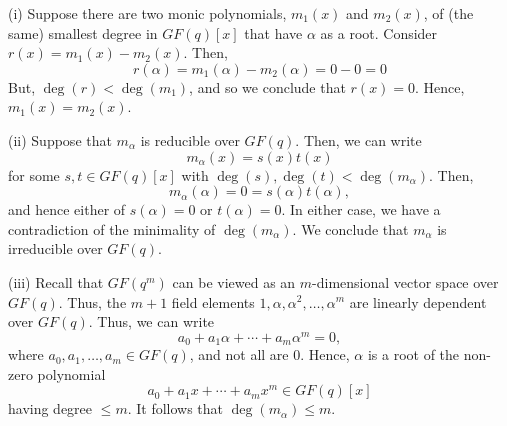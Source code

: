 \begin{Proof}{}{}
    (i) Suppose there are two monic polynomials, $ m_1(x) $ and $ m_2(x) $,
    of (the same) smallest degree in $ GF(q)[x] $ that have $ \alpha $ as a root. Consider
    $ r(x)=m_1(x)-m_2(x) $. Then,
    \[ r(\alpha)=m_1(\alpha)-m_2(\alpha)=0-0=0 \]
    But, $ \deg(r)<\deg(m_1) $, and so we conclude that $ r(x)=0 $. Hence, $ m_1(x)=m_2(x) $.

    (ii) Suppose that $ m_\alpha $ is reducible over $ GF(q) $. Then, we can write
    \[ m_\alpha(x)=s(x)t(x) \]
    for some $ s,t\in GF(q)[x] $ with $ \deg(s),\deg(t)<\deg(m_\alpha) $. Then,
    \[ m_\alpha(\alpha)=0=s(\alpha)t(\alpha), \]
    and hence either of $ s(\alpha)=0 $ or $ t(\alpha)=0 $. In either case,
    we have a contradiction of the minimality of $ \deg(m_\alpha) $. We conclude
    that $ m_\alpha $ is irreducible over $ GF(q) $.

    (iii) Recall that $ GF(q^m) $ can be viewed as an $ m $-dimensional vector space
    over $ GF(q) $. Thus, the $ m+1 $ field elements $ 1,\alpha,\alpha^2,\ldots ,\alpha^m $
    are linearly dependent over $ GF(q) $. Thus, we can write
    \[ a_0+a_1\alpha+\cdots+a_m\alpha^m=0, \]
    where $ a_0,a_1,\ldots ,a_m\in GF(q) $, and not all are $ 0 $. Hence, $ \alpha $
    is a root of the non-zero polynomial
    \[ a_0+a_1x+\cdots+a_m x^m\in GF(q)[x] \]
    having degree $ \leqslant m $. It follows that $ \deg(m_\alpha) \leqslant m $.
\end{Proof}
